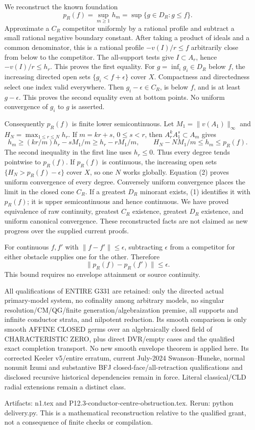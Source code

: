 We reconstruct the known foundation
\[
 p_R(f)=\sup_{m\ge1}h_m
       =\sup\{g\in D_R:g\le f\}.                       \tag{1}
\]
Approximate a $C_R$ competitor uniformly by a rational profile and subtract
a small rational negative boundary constant. After taking a product of
ideals and a common denominator, this is a rational profile $-v(I)/r\le f$
arbitrarily close from below to the competitor. The all-support tests give
$I\subset A_r$, hence $-v(I)/r\le h_r$. This proves the first equality.
For $g=\inf_i g_i\in D_R$ below $f$, the increasing directed open sets
$\{g_i<f+\epsilon\}$ cover $X$. Compactness and directedness select one
index valid everywhere. Then $g_i-\epsilon\in C_R$, is below $f$, and is
at least $g-\epsilon$. This proves the second equality even at bottom
points. No uniform convergence of $g_i$ to $g$ is asserted.

Consequently $p_R(f)$ is finite lower semicontinuous. Let
$M_1=\|v(A_1)\|_\infty$ and $H_N=\max_{1\le r\le N}h_r$.
If $m=kr+s$, $0\le s<r$, then
$A_r^kA_1^s\subset A_m$ gives
\[
 h_m\ge(kr/m)h_r-sM_1/m\ge h_r-rM_1/m,
 \qquad H_N-NM_1/m\le h_m\le p_R(f).                    \tag{2}
\]
The second inequality in the first line uses $h_r\le0$.
Thus every degree tends pointwise to $p_R(f)$. If $p_R(f)$ is continuous,
the increasing open sets $\{H_N>p_R(f)-\epsilon\}$ cover $X$, so one $N$
works globally. Equation (2) proves uniform convergence of every degree.
Conversely uniform convergence places the limit in the closed cone $C_R$.
If a greatest $D_R$ minorant exists, (1) identifies it with $p_R(f)$; it is
upper semicontinuous and hence continuous. We have proved equivalence of
raw continuity, greatest $C_R$ existence, greatest $D_R$ existence, and
uniform canonical convergence. These reconstructed facts are not claimed
as new progress over the supplied current proofs.

For continuous $f,f'$ with $\|f-f'\|\le\epsilon$, subtracting $\epsilon$
from a competitor for either obstacle supplies one for the other. Therefore
\[
                  \|p_R(f)-p_R(f')\|\le\epsilon.          \tag{3}
\]
This bound requires no envelope attainment or source continuity.

All qualifications of ENTIRE G331 are retained: only the directed actual
primary-model system, no cofinality among arbitrary models, no singular
resolution/CM/QG/finite generation/algebraization premise, all supports and
infinite conductor strata, and nilpotent reduction. Its smooth comparison
is only smooth AFFINE CLOSED germs over an algebraically closed field of
CHARACTERISTIC ZERO, plus direct DVR/empty cases and the qualified exact
completion transport. No new smooth envelope theorem is applied here.
Its corrected Keeler v5/entire erratum, current July-2024 Swanson--Huneke,
normal nonunit Izumi and substantive BFJ closed-face/all-retraction
qualifications and disclosed recursive historical dependencies remain in
force. Literal classical/CLD radial extensions remain a distinct class.

Artifacts: n1.tex and P12.3-conductor-centre-obstruction.tex. Rerun:
python delivery.py. This is a mathematical reconstruction relative to the
qualified grant, not a consequence of finite checks or compilation.
